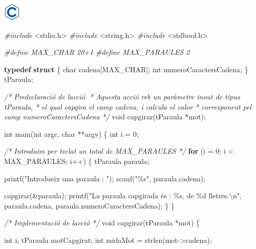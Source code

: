 \documentclass[
]{book}
\newenvironment{Shaded}{\begin{snugshade}}{\end{snugshade}}
\newcommand{\CommentTok}[1]{\textcolor[rgb]{0.56,0.35,0.01}{\textit{#1}}}
\newcommand{\ControlFlowTok}[1]{\textcolor[rgb]{0.13,0.29,0.53}{\textbf{#1}}}
\newcommand{\DataTypeTok}[1]{\textcolor[rgb]{0.13,0.29,0.53}{#1}}
\newcommand{\DecValTok}[1]{\textcolor[rgb]{0.00,0.00,0.81}{#1}}
\newcommand{\ImportTok}[1]{#1}
\newcommand{\KeywordTok}[1]{\textcolor[rgb]{0.13,0.29,0.53}{\textbf{#1}}}
\newcommand{\NormalTok}[1]{#1}
\newcommand{\PreprocessorTok}[1]{\textcolor[rgb]{0.56,0.35,0.01}{\textit{#1}}}
\newcommand{\SpecialCharTok}[1]{\textcolor[rgb]{0.00,0.00,0.00}{#1}}
\newcommand{\StringTok}[1]{\textcolor[rgb]{0.31,0.60,0.02}{#1}}
\begin{document}
\includegraphics{./img/c.png}

\begin{Shaded}
\begin{Highlighting}[]
\PreprocessorTok{\#include }\ImportTok{\textless{}stdio.h\textgreater{}}
\PreprocessorTok{\#include }\ImportTok{\textless{}string.h\textgreater{}}
\PreprocessorTok{\#include }\ImportTok{\textless{}stdbool.h\textgreater{}}

\PreprocessorTok{\#define MAX\_CHAR 20+1}
\PreprocessorTok{\#define MAX\_PARAULES 2}

\KeywordTok{typedef} \KeywordTok{struct}\NormalTok{ \{}
    \DataTypeTok{char}\NormalTok{ cadena[MAX\_CHAR];}
    \DataTypeTok{int}\NormalTok{ numeroCaractersCadena;}
\NormalTok{\} tParaula;}

\CommentTok{/* Predeclaració de l\textquotesingle{}acció.}
\CommentTok{ * Aquesta acció reb un paràmetre inout de tipus tParaula,}
\CommentTok{ * el qual capgira el camp cadena, i calcula el valor}
\CommentTok{ * corresponent pel camp numeroCaractersCadena }
\CommentTok{ */}
\DataTypeTok{void}\NormalTok{ capgirar(tParaula *mot);}

\DataTypeTok{int}\NormalTok{ main(}\DataTypeTok{int}\NormalTok{ argc, }\DataTypeTok{char}\NormalTok{ **argv) \{}
    \DataTypeTok{int}\NormalTok{ i = }\DecValTok{0}\NormalTok{;}
    
    \CommentTok{/* Introduim per teclat un total de MAX\_PARAULES */}
    \ControlFlowTok{for}\NormalTok{ (i = }\DecValTok{0}\NormalTok{; i \textless{} MAX\_PARAULES; i++) \{}
\NormalTok{        tParaula paraula;}
    
\NormalTok{        printf(}\StringTok{"Introdueix una paraula : "}\NormalTok{);}
\NormalTok{        scanf(}\StringTok{"\%s"}\NormalTok{, paraula.cadena);}
    
\NormalTok{        capgirar(\&paraula);}
\NormalTok{        printf(}\StringTok{"La paraula capgirada és : \%s, de \%d lletres.}\SpecialCharTok{\textbackslash{}n}\StringTok{"}\NormalTok{, paraula.cadena, paraula.numeroCaractersCadena);}
\NormalTok{    \}}
\NormalTok{\}}

\CommentTok{/* Implementació de l\textquotesingle{}acció */}
\DataTypeTok{void}\NormalTok{ capgirar(tParaula *mot) \{}
    
    \DataTypeTok{int}\NormalTok{ i;}
\NormalTok{    tParaula motCapgirat;}
    \DataTypeTok{int}\NormalTok{ midaMot = strlen(mot{-}\textgreater{}cadena);}
 

\end{Highlighting}
\end{Shaded}
\end{document}
